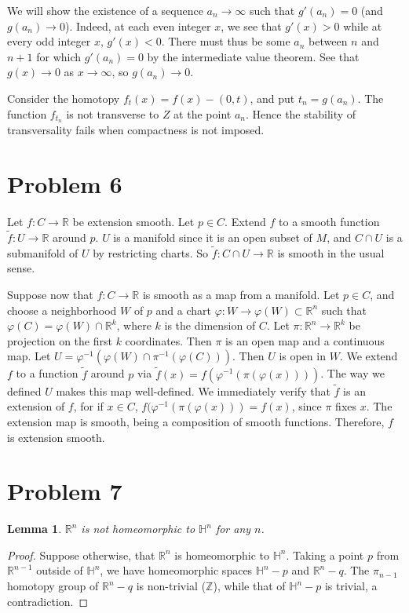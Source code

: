 \documentclass{amsart}
\numberwithin{equation}{section}
\theoremstyle{plain}
\newtheorem{lemma}[theorem]{Lemma}
\theoremstyle{definition}
\theoremstyle{remark}
\newcommand{\Z}{\mathbb{Z}}
\renewcommand{\_}[2]{\underbrace{#1}_{#2}}
\renewcommand{\^}[2]{\overbrace{#1}_{#2}}
\newcommand{\R}{\mathbb{R}}
\renewcommand{\H}{\mathbb{H}}
\begin{document}
We will show the existence of a sequence $a_n \to \infty$ such that $g'(a_n) = 0$ (and $g(a_n) \to 0$). Indeed, at each even integer $x$, we see that $g'(x)>0$ while at every odd integer $x$, $g'(x)<0$. There must thus be some $a_n$ between $n$ and $n+1$ for which $g'(a_n) = 0$ by the intermediate value theorem. See that $g(x) \to 0$ as $x \to \infty$, so $g(a_n) \to 0$. 

Consider the homotopy $f_t(x) = f(x) - (0,t)$, and put $t_n = g(a_n)$. The function $f_{t_n}$ is not transverse to $Z$ at the point $a_n$. Hence the stability of transversality fails when compactness is not imposed.
\section*{Problem 6}

Let $f:C\to \R$ be extension smooth. Let $p \in C$. Extend $f$ to a smooth function $\tilde f: U\to \R$ around $p$. $U$ is a manifold since it is an open subset of $M$, and $C\cap U$ is a submanifold of $U$ by restricting charts. So $\tilde f: C\cap U \to \R$ is smooth in the usual sense. 

Suppose now that $f:C\to \R$ is smooth as a map from a manifold. Let $p\in C$, and choose a neighborhood $W$ of $p$ and a chart $\varphi: W\to \varphi(W) \subset \R^n$ such that $\varphi(C) = \varphi(W) \cap \R^k$, where $k$ is the dimension of $C$. Let $\pi: \R^n \to \R^k$ be projection on the first $k$ coordinates. Then $\pi$ is an open map and a continuous map. Let $U = \varphi^{-1}(\varphi(W) \cap \pi^{-1}(\varphi(C)))$. Then $U$ is open in $W$. We extend $f$ to a function $\tilde f$ around $p$ via $\tilde f(x) = f(\varphi^{-1}(\pi(\varphi(x))))$. The way we defined $U$ makes this map well-defined. We immediately verify that $\tilde f$ is an extension of $f$, for if $x\in C$, $f(\varphi^{-1}(\pi(\varphi(x))) = f(x)$, since $\pi$ fixes $x$. The extension map is smooth, being a composition of smooth functions. Therefore, $f$ is extension smooth.

\section*{Problem 7}
\begin{lemma}
  $\R^n$ is not homeomorphic to $\H^n$ for any $n$. 
\end{lemma}
\begin{proof}
  Suppose otherwise, that $\R^n$ is homeomorphic to $\H^n$. Taking a point $p$ from $\R^{n-1}$ outside of $\H^n$, we have homeomorphic spaces $\H^n-p$ and $\R^n-q$. The $\pi_{n-1}$ homotopy group of $\R^n-q$ is non-trivial ($\Z$), while that of $\H^n-p$ is trivial, a contradiction. 
\end{proof}
\end{document}
